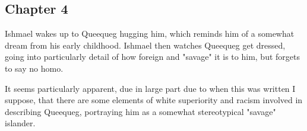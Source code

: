 \subsection{Chapter 4}

Ishmael wakes up to Queequeg hugging him, which reminds him of a somewhat
dream from his early childhood. Ishmael then watches Queequeg get dressed,
going into particularly detail of how foreign and "savage" it is to him, but
forgets to say no homo.

It seems particularly apparent, due in large part due to when this was written
I suppose, that there are some elements of white superiority and racism
involved in describing Queequeg, portraying him as a somewhat stereotypical
"savage" islander.
